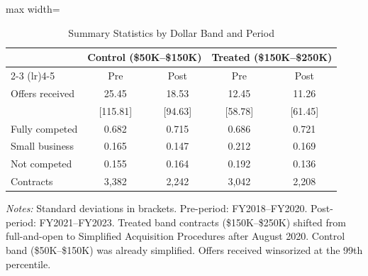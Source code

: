 \begin{table}[H]
\centering
\caption{Summary Statistics by Dollar Band and Period}
\label{tab:summary}
\begin{threeparttable}
\begin{adjustbox}{max width=\textwidth}
\begin{tabular}{lcccc}
\toprule
 & \multicolumn{2}{c}{Control (\$50K--\$150K)} & \multicolumn{2}{c}{Treated (\$150K--\$250K)} \\
\cmidrule(lr){2-3} \cmidrule(lr){4-5}
 & Pre & Post & Pre & Post \\
\midrule
Offers received & 25.45 & 18.53 & 12.45 & 11.26 \\
 & [115.81] & [94.63] & [58.78] & [61.45] \\
Fully competed & 0.682 & 0.715 & 0.686 & 0.721 \\
Small business & 0.165 & 0.147 & 0.212 & 0.169 \\
Not competed & 0.155 & 0.164 & 0.192 & 0.136 \\
\midrule
Contracts & 3,382 & 2,242 & 3,042 & 2,208 \\
\bottomrule
\end{tabular}
\end{adjustbox}
\begin{tablenotes}[flushleft]
\small
\item \textit{Notes:} Standard deviations in brackets. Pre-period: FY2018--FY2020. Post-period: FY2021--FY2023. Treated band contracts (\$150K--\$250K) shifted from full-and-open to Simplified Acquisition Procedures after August 2020. Control band (\$50K--\$150K) was already simplified. Offers received winsorized at the 99th percentile.
\end{tablenotes}
\end{threeparttable}
\end{table}
